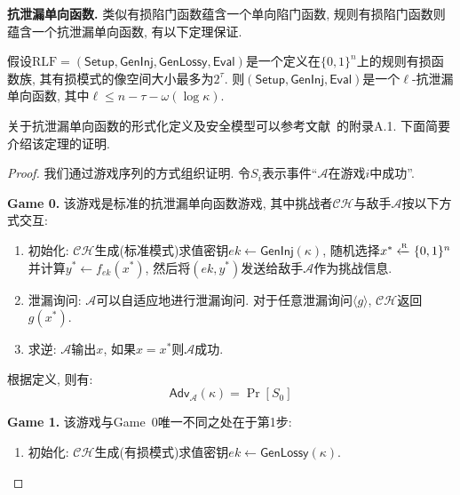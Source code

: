 \medskip\noindent\textbf{抗泄漏单向函数.} 类似有损陷门函数蕴含一个单向陷门函数, 规则有损陷门函数则蕴含一个抗泄漏单向函数, 有以下定理保证.
\begin{theorem}\label{theorem:LF-to-LROWF}
假设$\text{RLF} = (\mathsf{Setup}, \mathsf{GenInj}, \mathsf{GenLossy}, \mathsf{Eval})$是一个定义在$\{0, 1\}^n$上的规则有损函数族, 其有损模式的像空间大小最多为$2^\tau$. 则$(\mathsf{Setup}, \mathsf{GenInj}, \mathsf{Eval})$是一个$\ell$-抗泄漏单向函数, 其中$\ell \leq n - \tau -\omega(\log \kappa)$. 
\end{theorem}
关于抗泄漏单向函数的形式化定义及安全模型可以参考文献~\cite{Chen-TCS-2018}的附录A.1. 下面简要介绍该定理的证明.
\begin{proof}
我们通过游戏序列的方式组织证明. 令$S_i$表示事件``$\mathcal{A}$在游戏$i$中成功''. 
\begin{trivlist}
\item \textbf{Game 0.} 该游戏是标准的抗泄漏单向函数游戏, 其中挑战者$\mathcal{CH}$与敌手$\mathcal{A}$按以下方式交互: 
    \begin{enumerate} \itemsep 1pt \parskip 0pt \parsep 0pt
        \item 初始化: $\mathcal{CH}$生成(标准模式)求值密钥$ek \leftarrow \mathsf{GenInj}(\kappa)$, 
            随机选择$x^* \xleftarrow{\textup{\tiny R}} \{0,1\}^n$并计算$y^* \leftarrow f_{ek}(x^*)$, 然后将$(ek, y^*)$发送给敌手$\mathcal{A}$作为挑战信息. 

        \item 泄漏询问: $\mathcal{A}$可以自适应地进行泄漏询问. 对于任意泄漏询问$\langle g \rangle$, $\mathcal{CH}$返回$g(x^*)$. 

        \item 求逆: $\mathcal{A}$输出$x$, 如果$x = x^*$则$\mathcal{A}$成功.
    \end{enumerate}
    根据定义, 则有: 
    \begin{equation*}
        \mathsf{Adv}_\mathcal{A}(\kappa) = \Pr[S_0]
    \end{equation*}

\item \textbf{Game 1.} 该游戏与Game~0唯一不同之处在于第1步:
    \begin{enumerate} \itemsep 1pt \parskip 0pt \parsep 0pt
        \item 初始化: $\mathcal{CH}$生成(有损模式)求值密钥$ek \leftarrow \mathsf{GenLossy}(\kappa)$. 
    \end{enumerate}  


\end{trivlist}
\end{proof}
